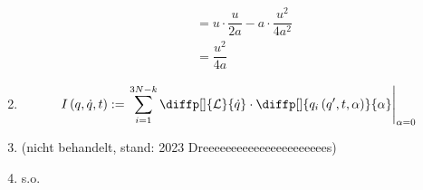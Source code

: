 \documentclass[a4paper,12pt]{article}
\numberwithin{equation}{section}
\begin{document}
\begin{enumerate}[label=\arabic*.]
\begin{align*}
                                       &=u\cdot \dfrac{u}{2a}-a\cdot \dfrac{u^2}{4a^2}\\
                                       &=\dfrac{u^2}{4a}
                \end{align*} 
        \item \begin{align*} 
                I\left(q,\dot{q},t\right):=\left.\sum_{i=1}^{3N-k}\diffp[]{\mathcal{L}}{\dot{q}}\cdot \diffp[]{q_i\left(q',t,\alpha \right)}{\alpha }\right|_{\alpha =0}
        \end{align*} 
        \item (nicht behandelt, stand: 2023 Dreeeeeeeeeeeeeeeeeeeeees)
        \item s.o.\
\end{enumerate}

\newpage
\end{document}
